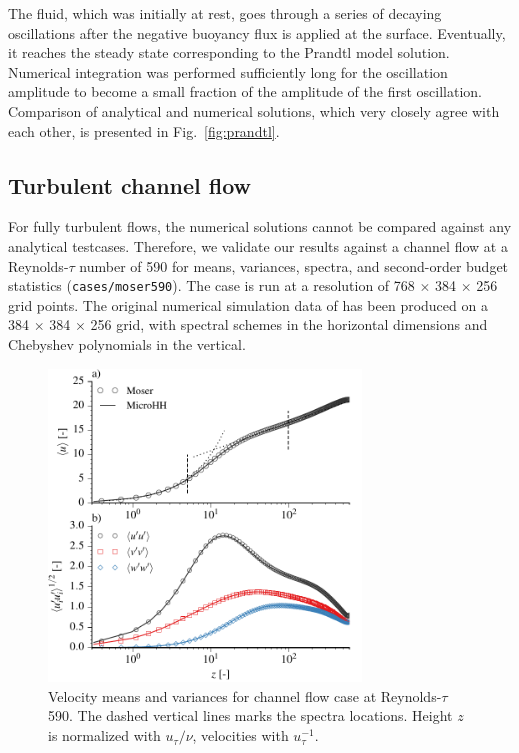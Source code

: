 \documentclass[gmd,manuscript]{copernicus}
\begin{document}
The fluid, which was initially at rest, goes through a series of decaying oscillations after the negative buoyancy flux is applied at the surface. Eventually, it reaches the steady state corresponding to the Prandtl model solution. Numerical integration was performed sufficiently long for the oscillation amplitude to become a small fraction of the amplitude of the first oscillation. Comparison of analytical and numerical solutions, which very closely agree with each other, is presented in Fig.~\ref{fig:prandtl}.

\subsection{Turbulent channel flow}
For fully turbulent flows, the numerical solutions cannot be compared against any analytical testcases. Therefore, we validate our results against a channel flow at a Reynolds-$\tau$  number of 590 \citep{Moser1999} for means, variances, spectra, and second-order budget statistics (\texttt{cases/moser590}). The case is run at a resolution of 768 $\times$ 384 $\times$ 256 grid points. The original numerical simulation data of \citet{Moser1999} has been produced on a 384 $\times$ 384 $\times$ 256 grid, with spectral schemes in the horizontal dimensions and Chebyshev polynomials in the vertical.
\begin{figure}[t]
	\vspace*{2mm}
	\begin{center}
		\includegraphics[width=8.3cm]{figs/gmd_m590_umean_var.pdf}
	\end{center}
	\caption{Velocity means and variances for \citet{Moser1999} channel flow case at Reynolds-$\tau$ 590. The dashed vertical lines marks the spectra locations. Height $z$ is normalized with $u_\tau / \nu$, velocities with $u_\tau^{-1}$.}\label{fig:moser_velocity}
\end{figure}
\end{document}
